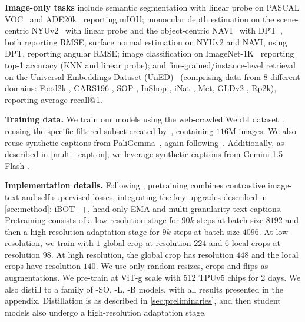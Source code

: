 \noindent\textbf{Image-only tasks} include semantic segmentation with linear probe on PASCAL VOC~\citep{everingham2010pascal} and ADE20k~\citep{zhou2017ade20k} reporting mIOU; monocular depth estimation on the scene-centric NYUv2~\citep{silberman2012indoor} with linear probe and the object-centric NAVI~\citep{jampani2023navi} with DPT~\cite{ranftl2021vision}, both reporting RMSE; surface normal estimation on NYUv2 and NAVI, using DPT, reporting angular RMSE; image classification on ImageNet-1K~\citep{russakovsky2015imagenet} reporting top-1 accuracy (KNN and linear probe); and fine-grained/instance-level retrieval on the Universal Embeddings Dataset (UnED)~\citep{ypsilantis2023uned} (comprising data from $8$ different domains: Food2k \citep{min2023large}, CARS196 \citep{krause20133d}, SOP \citep{song2016deep}, InShop \citep{liu2016deepfashion}, iNat \citep{van2018inaturalist}, Met\citep{ypsilantis2021met}, GLDv2 \cite{weyand2020google}, Rp2k\cite{peng2020rp2k}), reporting average recall@1.

\noindent\textbf{Training data.}
We train our models using the web-crawled WebLI dataset~\citep{chen23pali}, reusing the specific filtered subset created by~\cite{tips_paper}, containing $116$M images.
We also reuse synthetic captions from PaliGemma~\citep{beyer2024paligemma}, again following~\cite{tips_paper}.
Additionally, as described in \cref{multi_caption}, we leverage synthetic captions from Gemini 1.5 Flash \cite{geminiteam2024gemini}.

\noindent\textbf{Implementation details.}
Following \citep{tips_paper}, pretraining combines contrastive image-text and self-supervised losses, integrating the key upgrades described in \cref{sec:method}: iBOT++, head-only EMA and multi-granularity text captions.
Pretraining consists of a low-resolution stage for $90k$ steps at batch size $8192$ and then a high-resolution adaptation stage for $9k$ steps at batch size $4096$.
At low resolution, we train with $1$ global crop at resolution $224$ and $6$ local crops at resolution $98$.
At high resolution, the global crop has resolution $448$ and the local crops have resolution $140$.
We use only random resizes, crops and flips as augmentations.
We pre-train at ViT-g scale with 512 TPUv5 chips for 2 days.
We also distill to a family of -SO, -L, -B models, with all results presented in the appendix.
Distillation is as described in \cref{sec:preliminaries}, and then student models also undergo a high-resolution adaptation stage. 




